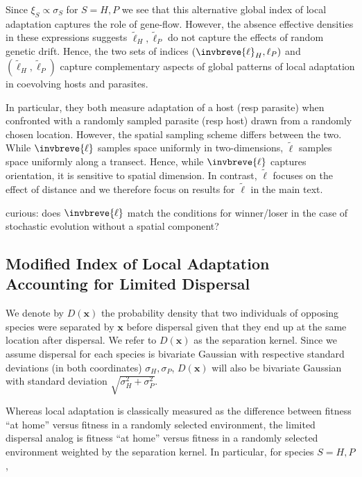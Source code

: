 \documentclass{article}
\begin{document}
Since \(\xi_S\propto\sigma_S\) for \(S=H,P\) we see that this
alternative global index of local adaptation captures the role of
gene-flow. However, the absence effective densities in these expressions
suggests \(\tilde{\ell}_H,\tilde{\ell}_P\) do not capture the effects of
random genetic drift. Hence, the two sets of indices
\((\invbreve{\ell}_H,{\ell}_P)\) and \((\tilde{\ell}_H,\tilde{\ell}_P)\)
capture complementary aspects of global patterns of local adaptation in
coevolving hosts and parasites.

In particular, they both measure adaptation of a host (resp parasite)
when confronted with a randomly sampled parasite (resp host) drawn from
a randomly chosen location. However, the spatial sampling scheme differs
between the two. While \(\invbreve{\ell}\) samples space uniformly in
two-dimensions, \(\tilde{\ell}\) samples space uniformly along a
transect. Hence, while \(\invbreve{\ell}\) captures orientation, it is
sensitive to spatial dimension. In contrast, \(\tilde{\ell}\) focuses on
the effect of distance and we therefore focus on results for
\(\tilde{\ell}\) in the main text.

curious: does \(\invbreve{\ell}\) match the conditions for winner/loser
in the case of stochastic evolution without a spatial component?

\hypertarget{modified-index-of-local-adaptation-accounting-for-limited-dispersal}{%
\subsection{Modified Index of Local Adaptation Accounting for Limited
Dispersal}\label{modified-index-of-local-adaptation-accounting-for-limited-dispersal}}

We denote by \(D(\pmb x)\) the probability density that two individuals
of opposing species were separated by \(\pmb x\) before dispersal given
that they end up at the same location after dispersal. We refer to
\(D(\pmb x)\) as the separation kernel. Since we assume dispersal for
each species is bivariate Gaussian with respective standard deviations
(in both coordinates) \(\sigma_H,\sigma_P\), \(D(\pmb x)\) will also be
bivariate Gaussian with standard deviation
\(\sqrt{\sigma_H^2+\sigma_P^2}\).

Whereas local adaptation is classically measured as the difference
between fitness \enquote{at home} versus fitness in a randomly selected
environment, the limited dispersal analog is fitness \enquote{at home}
versus fitness in a randomly selected environment weighted by the
separation kernel. In particular, for species \(S=H,P\),
\end{document}
